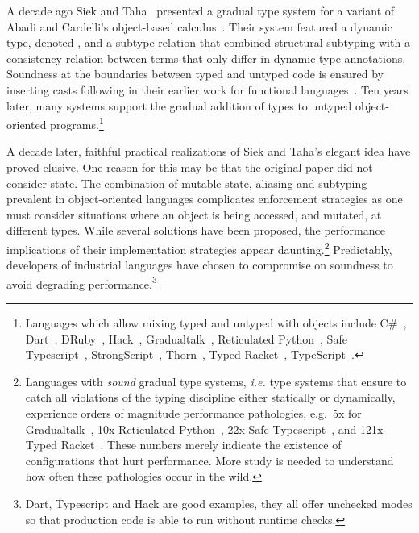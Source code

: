\documentclass[acmlarge, anonymous, authordraft, review]{acmart} %
\begin{document}
\noindent A decade ago Siek and Taha~\cite{SiekTaha07} presented a gradual
type system for a variant of Abadi and Cardelli's object-based
calculus~\cite{cardelli:1996:theory-of-objects}. Their system featured a
dynamic type, denoted \any, and a subtype relation that combined structural
subtyping with a consistency relation between terms that only differ in
dynamic type annotations.  Soundness at the boundaries between typed and
untyped code is ensured by inserting casts following in their earlier work
for functional languages~\cite{SiekTaha06}.  Ten years later, many systems
support the gradual addition of types to untyped object-oriented
programs.\footnote{Languages which allow mixing typed and untyped with
  objects include
C\#~\cite{Bierman10},
Dart~\cite{dart13}, 
DRuby~\cite{FurrAF2009},
Hack~\cite{hack13}, 
Gradualtalk~\cite{GS13},
Reticulated Python~\cite{siek14}, 
Safe Typescript~\cite{safe-typescript},
StrongScript~\cite{ecoop15}, 
Thorn~\cite{oopsla09}, 
Typed Racket~\cite{Takikawa:2012}, 
TypeScript~\cite{BAT14}.}

A decade later, faithful practical realizations of Siek and Taha's elegant
idea have proved elusive. One reason for this may be that the original paper
did not consider state. The combination of mutable state, aliasing and
subtyping prevalent in object-oriented languages complicates enforcement
strategies as one must consider situations where an object is being
accessed, and mutated, at different types. While several solutions have been
proposed, the performance implications of their implementation strategies
appear daunting.\footnote{Languages with \emph{sound} gradual type systems,
  \emph{i.e.} type systems that ensure to catch all violations of the typing
  discipline either statically or dynamically, experience orders of
  magnitude performance pathologies, e.g.~5x for
  Gradualtalk~\cite{allende13}, 10x Reticulated Python~\cite{siek14}, 22x
  Safe Typescript~\cite{safe-typescript}, and 121x Typed
  Racket~\cite{popl16}. These numbers merely indicate the existence of
  configurations that hurt performance. More study is needed to understand
  how often these pathologies occur in the wild.} Predictably, developers of
industrial languages have chosen to compromise on soundness to avoid
degrading performance.\footnote{Dart, Typescript and Hack are good examples,
  they all offer unchecked modes so that production code is able to run
  without runtime checks.}
\end{document}
